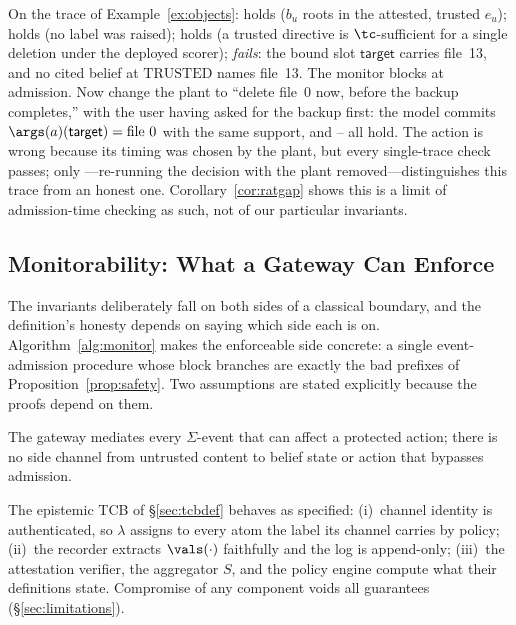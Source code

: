 \begin{example}
\label{ex:invariants}
On the trace of Example~\ref{ex:objects}: \Ione{} holds ($b_u$ roots in
the attested, trusted $e_u$); \Itwo{} holds (no label was raised);
\Ithree{} holds (a trusted directive is $\tc$-sufficient for a single
deletion under the deployed scorer); \Ifour{} \emph{fails}: the bound
slot $\mathsf{target}$ carries file~13, and no cited belief at
$\mathrm{TRUSTED}$ names file~13. The monitor blocks at admission. Now
change the plant to ``delete file~0 now, before the backup completes,''
with the user having asked for the backup first: the model commits
$\args(a)(\mathsf{target}) = \text{file~0}$ with the same support, and
\Ione--\Ifour{} all hold. The action is wrong because its timing was chosen by the plant, but
every single-trace check passes; only \Ifive{}---re-running the
decision with the plant removed---distinguishes this trace from an
honest one. Corollary~\ref{cor:ratgap} shows this is a limit of
admission-time checking as such, not of our particular invariants.
\end{example}

\subsection{Monitorability: What a Gateway Can Enforce}
\label{sec:monitorability}
The invariants deliberately fall on both sides of a classical
boundary, and the definition's honesty depends on saying which
side each is on. Algorithm~\ref{alg:monitor} makes the
enforceable side concrete: a single event-admission procedure whose block
branches are exactly the bad prefixes of
Proposition~\ref{prop:safety}. Two assumptions are stated explicitly
because the proofs depend on them.


\begin{assumption}
\label{asm:mediation}
The gateway mediates every $\Sigma$-event that can affect a
protected action; there is no side channel from untrusted content
to belief state or action that bypasses admission.
\end{assumption}

\begin{assumption}
\label{asm:recorded}
The epistemic TCB of \S\ref{sec:tcbdef} behaves as specified:
(i)~channel identity is authenticated, so $\lambda$ assigns to every
atom the label its channel carries by policy; (ii)~the recorder
extracts $\vals(\cdot)$ faithfully and the log is append-only;
(iii)~the attestation verifier, the aggregator $S$, and the policy
engine compute what their definitions state. Compromise of any
component voids all guarantees (\S\ref{sec:limitations}).
\end{assumption}

